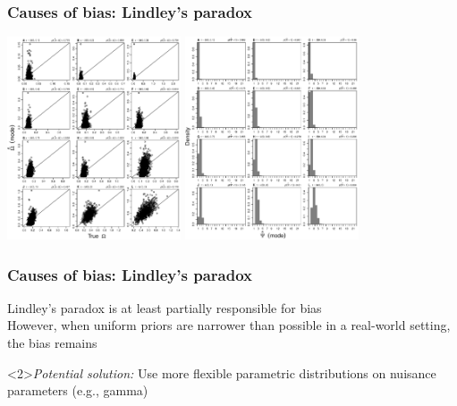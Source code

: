 \begin{frame}
    \frametitle{Causes of bias: Lindley's paradox}
    \begin{center}
        \includegraphics[height=6cm]{images/SS_accuracy_omega_modes_GLM_inform10.pdf} \quad
        \includegraphics[height=6cm]{images/SS_power_psi_modes_GLM_inform10.pdf}
    \end{center}
\end{frame}

\begin{frame}
    \frametitle{Causes of bias: Lindley's paradox}
    Lindley's paradox is at least partially responsible for bias\\
    \bigskip
    However, when uniform priors are narrower than possible in a real-world
    setting, the bias remains
    \bigskip
    \begin{block}<2>{\it Potential solution:}
        Use more flexible parametric distributions on nuisance parameters (e.g., gamma)
    \end{block}
\end{frame}

